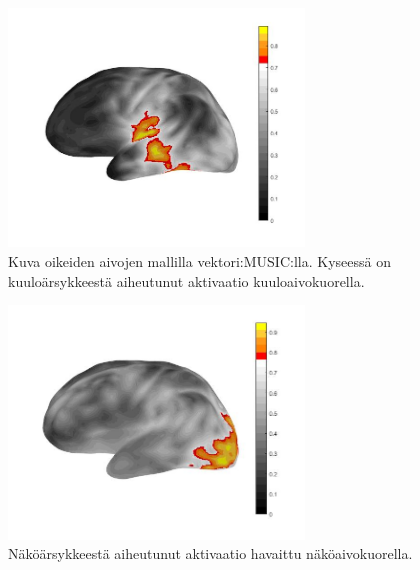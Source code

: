 \clearpage

\begin{figure}
    \centering
    \includegraphics[width=0.7\textwidth]{kuulo.jpg}
    \caption{Kuva oikeiden aivojen mallilla vektori:MUSIC:lla. Kyseessä on kuuloärsykkeestä aiheutunut aktivaatio kuuloaivokuorella.}
\end{figure}

\begin{figure}
    \centering
    \includegraphics[width=0.7\textwidth]{esim1.jpg}
    \caption{Näköärsykkeestä aiheutunut aktivaatio havaittu näköaivokuorella.}
\end{figure}